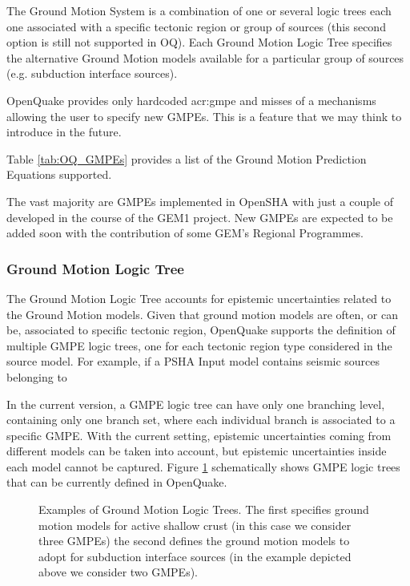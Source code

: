
%
The Ground Motion System is a combination of one or several logic 
trees each one associated with a specific tectonic region or group 
of sources (this second option is still not supported in OQ).
%
Each Ground Motion Logic Tree specifies the alternative Ground Motion 
models available for a particular group of sources (e.g. subduction 
interface sources).

OpenQuake provides only hardcoded \gls{acr:gmpe} 
and misses of a mechanisms allowing the user to specify new GMPEs. 
This is a feature that we may think to introduce in the future. 

Table \ref{tab:OQ_GMPEs} provides a list of the Ground Motion Prediction 
Equations supported. 

The vast majority are GMPEs implemented in OpenSHA with just a couple 
of developed in the course of the GEM1 project. New GMPEs are expected 
to be added soon with the contribution of some GEM's Regional Programmes.

\subsubsection{Ground Motion Logic Tree}
\label{hazard:gmpe_logic_tree}
The Ground Motion Logic Tree accounts for epistemic uncertainties related 
to the Ground Motion models.  
%
Given that ground motion models are often, or can be, associated to 
specific tectonic region,  OpenQuake supports the definition of multiple 
GMPE logic trees, one for each tectonic region type considered in 
the source model. 
% 
For example, if a PSHA Input model contains seismic sources belonging to 


In the current version, a GMPE logic tree can have only one 
branching level, containing only one branch set, where each individual branch 
is associated to a specific GMPE. With the current setting, epistemic 
uncertainties coming from different models can be taken into account, but 
epistemic uncertainties inside each model cannot be captured.
Figure \ref{fig:GMPELogicTree} schematically shows GMPE logic trees that can 
be currently defined in OpenQuake.
\renewcommand{\psedge}{\ncdiag[armA=0,angleB=180,armB=1cm]}
\begin{figure}[!hb]
\centering

\caption{Examples of Ground Motion Logic Trees. The first specifies ground
motion models for active shallow crust (in this case we consider three GMPEs) 
the second defines the ground motion models to adopt for subduction interface 
sources (in the example depicted above we consider two GMPEs).}
\label{fig:GMPELogicTree}
\end{figure}


%
